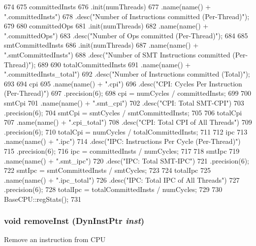 \begin{DoxyCode}
{674 
675     committedInsts
676         .init(numThreads)
677         .name(name() + ".committedInsts")
678         .desc("Number of Instructions committed (Per-Thread)");
679 
680     committedOps
681         .init(numThreads)
682         .name(name() + ".committedOps")
683         .desc("Number of Ops committed (Per-Thread)");
684 
685     smtCommittedInsts
686         .init(numThreads)
687         .name(name() + ".smtCommittedInsts")
688         .desc("Number of SMT Instructions committed (Per-Thread)");
689 
690     totalCommittedInsts
691         .name(name() + ".committedInsts_total")
692         .desc("Number of Instructions committed (Total)");
693 
694     cpi
695         .name(name() + ".cpi")
696         .desc("CPI: Cycles Per Instruction (Per-Thread)")
697         .precision(6);
698     cpi = numCycles / committedInsts;
699 
700     smtCpi
701         .name(name() + ".smt_cpi")
702         .desc("CPI: Total SMT-CPI")
703         .precision(6);
704     smtCpi = smtCycles / smtCommittedInsts;
705 
706     totalCpi
707         .name(name() + ".cpi_total")
708         .desc("CPI: Total CPI of All Threads")
709         .precision(6);
710     totalCpi = numCycles / totalCommittedInsts;
711 
712     ipc
713         .name(name() + ".ipc")
714         .desc("IPC: Instructions Per Cycle (Per-Thread)")
715         .precision(6);
716     ipc =  committedInsts / numCycles;
717 
718     smtIpc
719         .name(name() + ".smt_ipc")
720         .desc("IPC: Total SMT-IPC")
721         .precision(6);
722     smtIpc = smtCommittedInsts / smtCycles;
723 
724     totalIpc
725         .name(name() + ".ipc_total")
726         .desc("IPC: Total IPC of All Threads")
727         .precision(6);
728         totalIpc =  totalCommittedInsts / numCycles;
729 
730     BaseCPU::regStats();
731 }
\end{DoxyCode}
\hypertarget{classInOrderCPU_ada01a7a7568c85b0f98b9f0946be8635}{
\subsubsection[{removeInst}]{\setlength{\rightskip}{0pt plus 5cm}void removeInst ({\bf DynInstPtr} {\em inst})}}
\label{classInOrderCPU_ada01a7a7568c85b0f98b9f0946be8635}
Remove an instruction from CPU 



